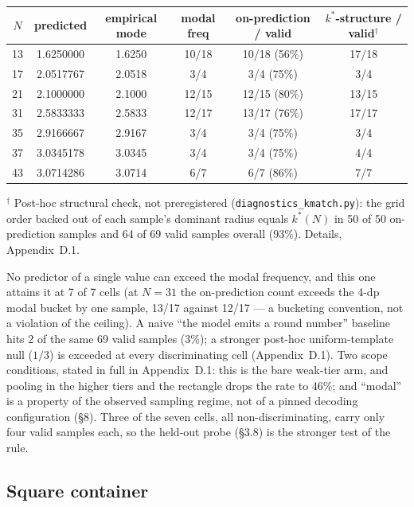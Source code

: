 \begin{center}
\begin{footnotesize}
\begin{tabular}{@{}cccccc@{}}
\toprule
$N$ & predicted & empirical mode & modal freq & on-prediction / valid & $k^*$-structure / valid$^\dagger$ \\
\midrule
13 & 1.6250000 & 1.6250 & 10/18 & 10/18 (56\%) & 17/18 \\
17 & 2.0517767 & 2.0518 & 3/4 & 3/4 (75\%) & 3/4 \\
21 & 2.1000000 & 2.1000 & 12/15 & 12/15 (80\%) & 13/15 \\
31 & 2.5833333 & 2.5833 & 12/17 & 13/17 (76\%) & 17/17 \\
35 & 2.9166667 & 2.9167 & 3/4 & 3/4 (75\%) & 3/4 \\
37 & 3.0345178 & 3.0345 & 3/4 & 3/4 (75\%) & 4/4 \\
43 & 3.0714286 & 3.0714 & 6/7 & 6/7 (86\%) & 7/7 \\
\bottomrule
\end{tabular}
\end{footnotesize}
\end{center}

$^\dagger$ Post-hoc structural check, not preregistered (\texttt{diagnostics\_kmatch.py}): the grid
order backed out of each sample's dominant radius equals $k^*(N)$ in 50 of 50 on-prediction samples
and 64 of 69 valid samples overall (93\%). Details, Appendix~D.1.

No predictor of a single value can exceed the modal frequency, and this one attains it at 7 of 7
cells (at $N = 31$ the on-prediction count exceeds the 4-dp modal bucket by one sample, 13/17
against 12/17 --- a bucketing convention, not a violation of the ceiling). A naive ``the model
emits a round number'' baseline hits 2 of the same 69 valid samples (3\%); a stronger post-hoc
uniform-template null ($1/3$) is exceeded at every discriminating cell (Appendix~D.1). Two scope conditions,
stated in full in Appendix~D.1: this is the bare weak-tier arm, and pooling in the higher tiers and
the rectangle drops the rate to 46\%; and ``modal'' is a property of the observed sampling regime,
not of a pinned decoding configuration (\S8). Three of the seven cells, all non-discriminating,
carry only four valid samples each, so the held-out probe (\S3.8) is the stronger test of the rule.

\subsection{Square container}

